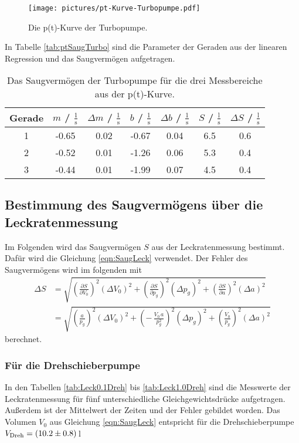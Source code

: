 \begin{figure}[H] %
  \centering
  \texttt{[image: pictures/pt-Kurve-Turbopumpe.pdf]}
  \caption{Die p(t)-Kurve der Turbopumpe.}
  \label{fig:ptturbo}
\end{figure}

In Tabelle \eqref{tab:ptSaugTurbo} sind die Parameter der Geraden aus der linearen Regression und das Saugvermögen aufgetragen.

\begin{table}[H]
  \centering
  \caption{Das Saugvermögen der Turbopumpe für die drei Messbereiche aus der p(t)-Kurve.}
  \label{tab:ptSaugTurbo}
    \begin{tabular}{c|c|c|c|c|c|c}
      Gerade & $m$ / $\frac{1}{\text{s}}$ & $\Delta m$ / $\frac{1}{\text{s}}$ & $b$ / $\frac{1}{\text{s}}$ & $\Delta b$ / $\frac{1}{\text{s}}$ & $S$ / $\frac{\text{l}}{\text{s}}$ & $\Delta S$ / $\frac{\text{l}}{\text{s}}$ \\
      \midrule
      1 & -0.65 & 0.02 & -0.67 & 0.04 & 6.5 & 0.6 \\
      2 & -0.52 & 0.01 & -1.26 & 0.06 & 5.3 & 0.4 \\
      3 & -0.44 & 0.01 & -1.99 & 0.07 & 4.5 & 0.4 \\
    \end{tabular}
\end{table}



\subsection{Bestimmung des Saugvermögens über die Leckratenmessung}
Im Folgenden wird das Saugvermögen $S$ aus der Leckratenmessung bestimmt. Dafür wird die Gleichung \eqref{eqn:SaugLeck} verwendet. Der Fehler des Saugvermögens wird im folgenden mit
\begin{align}
  \Delta S &= \sqrt{ \left(\frac{\partial S}{\partial V_0} \right)^2 (\Delta V_0)^2 + \left(\frac{\partial S}{\partial p_g} \right)^2 (\Delta p_g)^2 + \left(\frac{\partial S}{\partial a} \right)^2 (\Delta a)^2 } \nonumber \\
  &= \sqrt{ \left(\frac{a}{p_g} \right)^2 (\Delta V_0)^2 + \left(-\,\frac{V_0\,a}{p_g^2} \right)^2 (\Delta p_g)^2 + \left(\frac{V_0}{p_g} \right)^2 (\Delta a)^2 }
\end{align}
berechnet.



\subsubsection{Für die Drehschieberpumpe}
In den Tabellen \eqref{tab:Leck0.1Dreh} bis \eqref{tab:Leck1.0Dreh} sind die Messwerte der Leckratenmessung für fünf unterschiedliche Gleichgewichtsdrücke aufgetragen. Außerdem ist der Mittelwert der Zeiten und der Fehler gebildet worden. Das Volumen $V_0$ aus Gleichung \eqref{eqn:SaugLeck} entspricht für die Drehschieberpumpe $V_\text{Dreh} = (\num{10.2 +- 0.8})$\,l

